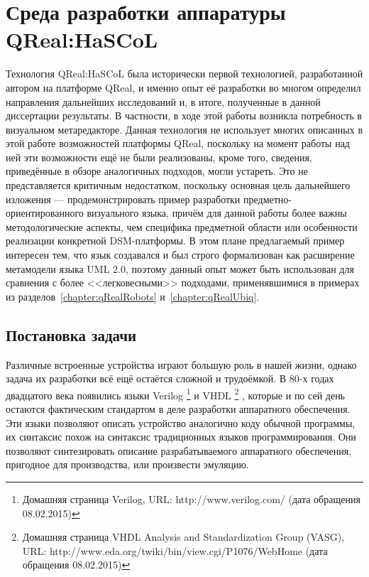 \section{Среда разработки аппаратуры QReal:HaSCoL}
Технология QReal:HaSCoL была исторически первой технологией, разработанной автором 
на платформе QReal, и именно опыт её разработки во многом определил направления дальнейших 
исследований и, в итоге, полученные в данной диссертации результаты. В частности, 
в ходе этой работы возникла потребность в визуальном метаредакторе. Данная технология 
не использует многих описанных в этой работе возможностей платформы QReal, поскольку 
на момент работы над ней эти возможности ещё не были реализованы, кроме того, сведения, 
приведённые в обзоре аналогичных подходов, могли устареть. Это не представляется критичным 
недостатком, поскольку основная цель дальнейшего изложения --- продемонстрировать 
пример разработки предметно-ориентированного визуального языка, причём для данной 
работы более важны методологические аспекты, чем специфика предметной области или особенности реализации конкретной \ac{DSM}-платформы. 
В этом плане предлагаемый пример интересен тем, что язык создавался и был строго формализован как расширение метамодели 
языка UML 2.0, поэтому данный опыт может быть использован для сравнения с более <<легковесными>> 
подходами, применявшимися в примерах из разделов~\ref{chapter:qRealRobots} и~\ref{chapter:qRealUbiq}.

\subsection{Постановка задачи}
Различные встроенные устройства играют большую роль в нашей жизни, однако задача их 
разработки всё ещё остаётся сложной и трудоёмкой. В 80-х годах двадцатого века появились языки Verilog%
\footnote{Домашняя страница Verilog, URL: http://www.verilog.com/ (дата обращения 08.02.2015)} и VHDL%
\footnote{Домашняя страница VHDL Analysis and Standardization Group (VASG), URL: http://www.eda.org/twiki/bin/view.cgi/P1076/WebHome (дата обращения 08.02.2015)}
, которые и по сей день остаются фактическим стандартом в деле разработки аппаратного 
обеспечения. Эти языки позволяют описать устройство аналогично коду обычной программы, 
их синтаксис похож на синтаксис традиционных языков программирования. Они позволяют 
синтезировать описание разрабатываемого аппаратного обеспечения, пригодное для производства, 
или произвести эмуляцию.

